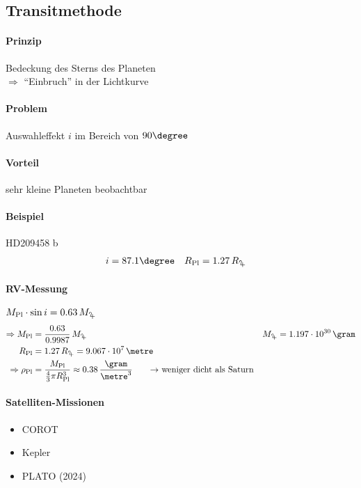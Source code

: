 \subsection{Transitmethode}
\paragraph{Prinzip} Bedeckung des Sterns des Planeten\\
$\Rightarrow$ "`Einbruch"' in der Lichtkurve

\paragraph{Problem} Auswahleffekt $i$ im Bereich von $90\degree$
\paragraph{Vorteil} sehr kleine Planeten beobachtbar
\paragraph{Beispiel} HD209458 b
\begin{align*}
    i &= 87.1\degree & R_{\Pl} &= 1.27\,R_{\jupiter}
\end{align*}
\paragraph{RV-Messung} $M_{\Pl} \cdot \sin i = 0.63\, M_{\jupiter}$
\begin{align*}
    \Rightarrow M_\Pl &= \frac{0.63}{0.9987}\,M_{\jupiter} & M_{\jupiter} &= 1.197 \cdot 10^{30}\,\gram \\
    R_\Pl &= 1.27\,R_{\jupiter} = 9.067 \cdot 10^{7}\,\metre \\
    \Rightarrow \rho_\Pl &= \frac{M_\Pl}{\frac{4}{3} \pi R_\Pl^3} \approx 0.38\,\frac{\gram}{\metre^3} \tag*{$\rightarrow$ weniger dicht als Saturn}
\end{align*}

\paragraph{Satelliten-Missionen}
\begin{itemize}
    \item COROT
    \item Kepler
    \item PLATO (2024)
\end{itemize}

